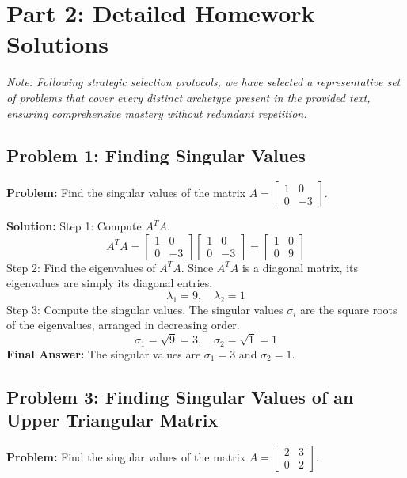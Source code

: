 \documentclass[11pt, letterpaper]{article}
\theoremstyle{definition}
\theoremstyle{remark}
\begin{document}
\newpage
\section{Part 2: Detailed Homework Solutions}
\textit{Note: Following strategic selection protocols, we have selected a representative set of problems that cover every distinct archetype present in the provided text, ensuring comprehensive mastery without redundant repetition.}

\subsection{Problem 1: Finding Singular Values}
\textbf{Problem:} Find the singular values of the matrix $A = \begin{bmatrix} 1 & 0 \\ 0 & -3 \end{bmatrix}$.

\textbf{Solution:}
Step 1: Compute $A^TA$.
\[
A^TA = \begin{bmatrix} 1 & 0 \\ 0 & -3 \end{bmatrix} \begin{bmatrix} 1 & 0 \\ 0 & -3 \end{bmatrix} = \begin{bmatrix} 1 & 0 \\ 0 & 9 \end{bmatrix}
\]
Step 2: Find the eigenvalues of $A^TA$.
Since $A^TA$ is a diagonal matrix, its eigenvalues are simply its diagonal entries.
\[
\lambda_1 = 9, \quad \lambda_2 = 1
\]
Step 3: Compute the singular values.
The singular values $\sigma_i$ are the square roots of the eigenvalues, arranged in decreasing order.
\[
\sigma_1 = \sqrt{9} = 3, \quad \sigma_2 = \sqrt{1} = 1
\]
\textbf{Final Answer:} The singular values are $\sigma_1 = 3$ and $\sigma_2 = 1$.

\vspace{1em}
\subsection{Problem 3: Finding Singular Values of an Upper Triangular Matrix}
\textbf{Problem:} Find the singular values of the matrix $A = \begin{bmatrix} 2 & 3 \\ 0 & 2 \end{bmatrix}$.
\end{document}

